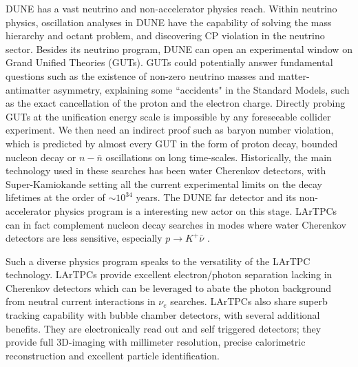 DUNE has a vast neutrino and non-accelerator physics reach. Within neutrino physics, oscillation analyses in DUNE have the capability of solving the mass hierarchy and octant problem,  and discovering CP violation in the neutrino sector. Besides its neutrino program, DUNE can open an experimental window on Grand Unified Theories (GUTs). GUTs could potentially answer fundamental questions such as the existence of non-zero neutrino masses and matter-antimatter asymmetry, explaining some ``accidents" in the Standard Models, such as the exact cancellation of the  proton and the electron charge.   Directly probing GUTs at the unification energy scale is impossible by any foreseeable collider experiment. We then need an indirect proof such as baryon number violation, which is predicted by almost every GUT in the form of proton decay, bounded nucleon decay or $n-\bar n$ oscillations on long time-scales. Historically, the main technology used in these searches has been water Cherenkov detectors, with Super-Kamiokande setting all the current experimental limits on the decay lifetimes at the order of $\sim 10 ^{34}$ years. The DUNE far detector and its non-accelerator physics program is a interesting new actor on this stage.  LArTPCs can in fact complement nucleon decay searches in modes where water Cherenkov detectors are less sensitive, especially $p\rightarrow K^+\bar{\nu}$  \cite{Adams:2013qkq}.


Such a diverse physics program speaks to the versatility of the LArTPC technology. LArTPCs provide excellent electron/photon separation \cite{Acciarri:2016sli} lacking in Cherenkov detectors which can be leveraged to abate the photon background from neutral current interactions  in $\nu_e$ searches. LArTPCs also share superb tracking capability with bubble chamber detectors, with several additional benefits. They are electronically read out and self triggered detectors; they provide full 3D-imaging with millimeter resolution, precise calorimetric reconstruction and excellent particle identification. %

